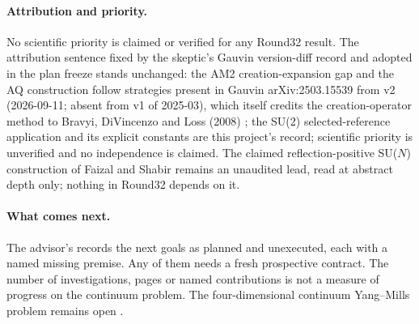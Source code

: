 \paragraph{Attribution and priority.}
No scientific priority is claimed or verified for any Round32 result. The
attribution sentence fixed by the skeptic's Gauvin version-diff record and
adopted in the plan freeze stands unchanged: the AM2 creation-expansion gap
and the AQ construction follow strategies present in Gauvin
arXiv:2503.15539 \cite{gauvin} from v2 (2026-09-11; absent from v1 of
2025-03), which itself credits the creation-operator method to Bravyi,
DiVincenzo and Loss (2008) \cite{bdl}; the SU(2) selected-reference
application and its explicit constants are this project's record; scientific
priority is unverified and no independence is claimed. The claimed
reflection-positive SU($N$) construction of Faizal and Shabir \cite{faizal}
remains an unaudited lead, read at abstract depth only; nothing in Round32
depends on it.

\paragraph{What comes next.}
The advisor's
 records the next
goals as planned and unexecuted, each with a named missing premise. Any of
them needs a fresh prospective contract. The number of investigations,
pages or named contributions is not a measure of progress on the continuum
problem. The four-dimensional continuum Yang--Mills problem remains open
\cite{clay}.

